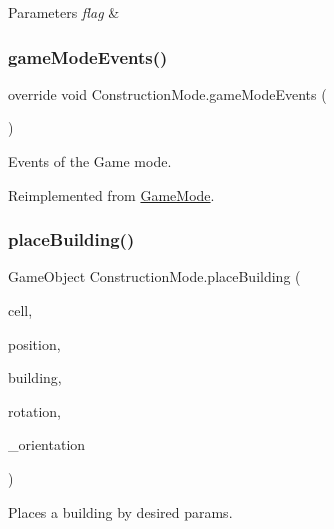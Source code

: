 \begin{DoxyParams}{Parameters}
{\em flag} & \\
\hline
\end{DoxyParams}
\mbox{\label{class_construction_mode_a58599c3aac705627c3b0fd034d54092a}} 
\subsubsection{\texorpdfstring{game\+Mode\+Events()}{gameModeEvents()}}
{\footnotesize\ttfamily override void Construction\+Mode.\+game\+Mode\+Events (\begin{DoxyParamCaption}{ }\end{DoxyParamCaption})\hspace{0.3cm}{\ttfamily [virtual]}}



Events of the Game mode. 



Reimplemented from \mbox{\hyperlink{class_game_mode_a32a61bf0dfef83cfc1724b92f3d50cdf}{Game\+Mode}}.

\mbox{\label{class_construction_mode_abc41d867b12bfe26c28bea8ce773614d}} 
\subsubsection{\texorpdfstring{place\+Building()}{placeBuilding()}}
{\footnotesize\ttfamily Game\+Object Construction\+Mode.\+place\+Building (\begin{DoxyParamCaption}\item[{\mbox{\hyperlink{class_cell}{Cell}}}]{cell,  }\item[{Vector3}]{position,  }\item[{Game\+Object}]{building,  }\item[{Quaternion}]{rotation,  }\item[{orientation}]{\+\_\+orientation }\end{DoxyParamCaption})}



Places a building by desired params. 


